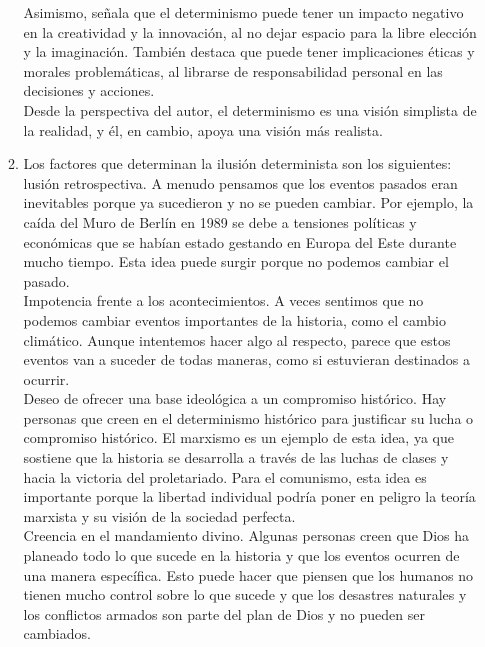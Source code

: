 \documentclass[10pt, a4paper]{article}
\begin{document}
\begin{enumerate}
\begin{enumerate}
          Asimismo, señala que el determinismo puede tener un impacto negativo en 
          la creatividad y la innovación, al no dejar espacio para la libre elección 
          y la imaginación. También destaca que puede tener implicaciones éticas 
          y morales problemáticas, al librarse de responsabilidad personal en 
          las decisiones y acciones.\\

          Desde la perspectiva del autor, el determinismo es una visión simplista 
          de la realidad,  y él, en cambio, apoya una visión más realista.

        \item Los factores que determinan la ilusión determinista son los siguientes:\\ 
          lusión retrospectiva. A menudo pensamos que los eventos pasados eran 
          inevitables porque ya sucedieron y no se pueden cambiar. Por ejemplo, 
          la caída del Muro de Berlín en 1989 se debe a tensiones políticas y 
          económicas que se habían estado gestando en Europa del Este durante 
          mucho tiempo. Esta idea puede surgir porque no podemos cambiar el 
          pasado.\\

          Impotencia frente a los acontecimientos. A veces sentimos que no podemos
          cambiar eventos importantes de la historia, como el cambio 
          climático. Aunque intentemos hacer algo al respecto, parece que estos 
          eventos van a suceder de todas maneras, como si estuvieran destinados 
          a ocurrir.\\ 

          Deseo de ofrecer una base ideológica a un compromiso histórico. Hay personas 
          que creen en el determinismo histórico para justificar su lucha o 
          compromiso histórico. El marxismo es un ejemplo de esta idea, ya que 
          sostiene que la historia se desarrolla a través de las luchas de clases 
          y hacia la victoria del proletariado. Para el comunismo, esta idea es 
          importante porque la libertad individual podría poner en peligro la 
          teoría marxista y su visión de la sociedad perfecta.\\
          
          Creencia en el mandamiento divino. Algunas personas creen que Dios 
          ha planeado todo lo que sucede en la historia y que los eventos ocurren 
          de una manera específica. Esto puede hacer que piensen que los humanos 
          no tienen mucho control sobre lo que sucede y que los desastres naturales 
          y los conflictos armados son parte del plan de Dios y no pueden ser cambiados. 
      \end{enumerate}
        

\end{enumerate}
\end{document}
